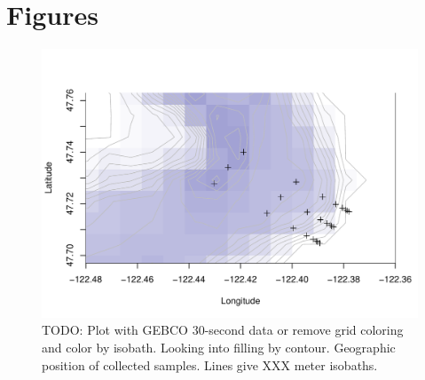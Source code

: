 \documentclass[11pt,letterpaper]{article} %
\begin{document}

\section*{Figures}

\begin{figure}[h!] %
  \centering
    \includegraphics[width=1\textwidth]{../../Figures/site_map.pdf}
    \caption{TODO: Plot with GEBCO 30-second data or remove grid coloring and color by isobath. Looking into filling by contour. Geographic position of collected samples. Lines give XXX meter isobaths.}
  \label{site_map} %
\end{figure}
\end{document}
